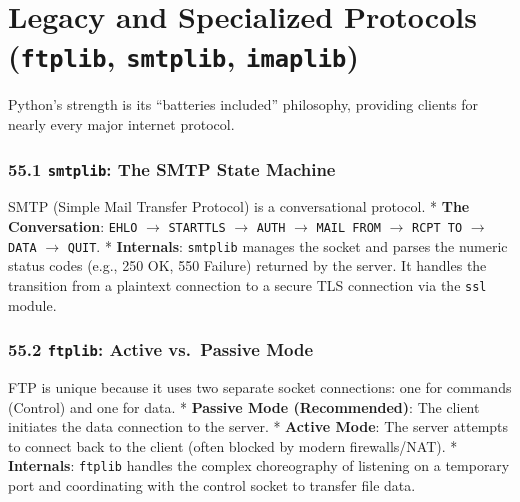 \hypertarget{legacy-and-specialized-protocols-ftplib-smtplib-imaplib}{%
\chapter{\texorpdfstring{Legacy and Specialized Protocols
(\texttt{ftplib}, \texttt{smtplib},
\texttt{imaplib})}{Legacy and Specialized Protocols (ftplib, smtplib, imaplib)}}\label{legacy-and-specialized-protocols-ftplib-smtplib-imaplib}}

Python's strength is its ``batteries included'' philosophy, providing
clients for nearly every major internet protocol.

\hypertarget{smtplib-the-smtp-state-machine}{%
\subsection{\texorpdfstring{55.1 \texttt{smtplib}: The SMTP State
Machine}{55.1 smtplib: The SMTP State Machine}}\label{smtplib-the-smtp-state-machine}}

SMTP (Simple Mail Transfer Protocol) is a conversational protocol. *
\textbf{The Conversation}: \passthrough{\lstinline!EHLO!}
\(\rightarrow\) \passthrough{\lstinline!STARTTLS!} \(\rightarrow\)
\passthrough{\lstinline!AUTH!} \(\rightarrow\)
\passthrough{\lstinline!MAIL FROM!} \(\rightarrow\)
\passthrough{\lstinline!RCPT TO!} \(\rightarrow\)
\passthrough{\lstinline!DATA!} \(\rightarrow\)
\passthrough{\lstinline!QUIT!}. * \textbf{Internals}:
\passthrough{\lstinline!smtplib!} manages the socket and parses the
numeric status codes (e.g., 250 OK, 550 Failure) returned by the server.
It handles the transition from a plaintext connection to a secure TLS
connection via the \passthrough{\lstinline!ssl!} module.

\hypertarget{ftplib-active-vs.-passive-mode}{%
\subsection{\texorpdfstring{55.2 \texttt{ftplib}: Active vs.~Passive
Mode}{55.2 ftplib: Active vs.~Passive Mode}}\label{ftplib-active-vs.-passive-mode}}

FTP is unique because it uses two separate socket connections: one for
commands (Control) and one for data. * \textbf{Passive Mode
(Recommended)}: The client initiates the data connection to the server.
* \textbf{Active Mode}: The server attempts to connect back to the
client (often blocked by modern firewalls/NAT). * \textbf{Internals}:
\passthrough{\lstinline!ftplib!} handles the complex choreography of
listening on a temporary port and coordinating with the control socket
to transfer file data.

